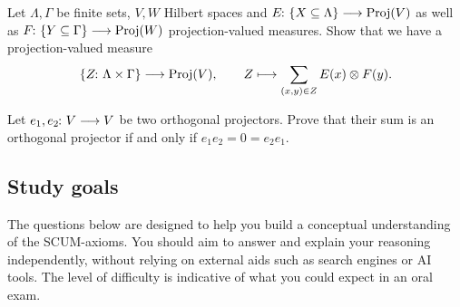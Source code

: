 \documentclass[a4paper, oneside, 12pt]{amsart}
\begin{document}
\begin{exercise}
  Let \(\Lambda, \Gamma\) be finite sets, \(V, W\) Hilbert spaces and \(E\from\{X \subseteq \Lambda\} \to \mathrm{Proj}(V)\) as well as \(F \from\{Y \subseteq \Gamma\} \to \mathrm{Proj}(W)\) projection-valued measures.
  Show that we have a projection-valued measure
  \begin{equation*}
    \{Z \from \Lambda \times \Gamma\} \to \mathrm{Proj}(V),\qquad Z\mapsto \sum_{(x,y) \in Z} E(x)\otimes F(y).
  \end{equation*}
\end{exercise}

\begin{exercise}
  Let \(e_{1}, e_{2} \from V\to V\) be two orthogonal projectors.
  Prove that their sum is an orthogonal projector if and only if \(e_{1}e_{2}= 0 = e_{2}e_{1}\).
\end{exercise}


\cleardoublepage
\subsection{Study goals}\label{sec:SCUM-study-goals}
The questions below are designed to help you build a conceptual understanding of the SCUM-axioms.
You should aim to answer and explain your reasoning independently, without relying on external aids such as search engines or AI tools.
The level of difficulty is indicative of what you could expect in an oral exam.
\end{document}
